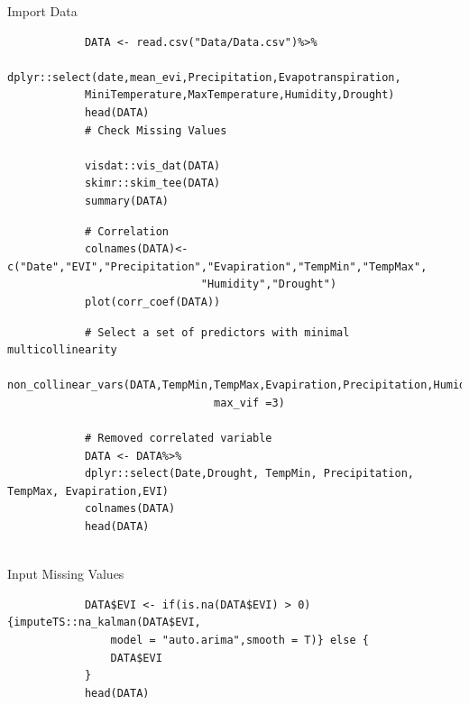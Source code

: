 \documentclass[12pt,a4paper]{book}
\begin{document}
			Import Data
			\begin{shaded}
				\begin{verbatim}
			DATA <- read.csv("Data/Data.csv")%>%
			dplyr::select(date,mean_evi,Precipitation,Evapotranspiration,
			MiniTemperature,MaxTemperature,Humidity,Drought)
			head(DATA)
			# Check Missing Values
			
			visdat::vis_dat(DATA)
			skimr::skim_tee(DATA)
			summary(DATA)
				\end{verbatim}
		\end{shaded}
	
				\begin{shaded}
				\begin{verbatim}
			# Correlation			
			colnames(DATA)<- c("Date","EVI","Precipitation","Evapiration","TempMin","TempMax",
			                  "Humidity","Drought")
			plot(corr_coef(DATA))
				\end{verbatim}
		\end{shaded}
	
				\begin{shaded}
				\begin{verbatim}
			# Select a set of predictors with minimal multicollinearity			
			non_collinear_vars(DATA,TempMin,TempMax,Evapiration,Precipitation,Humidity,Drought,
			                    max_vif =3)
			
			# Removed correlated variable			
			DATA <- DATA%>%
			dplyr::select(Date,Drought, TempMin, Precipitation, TempMax, Evapiration,EVI)			
			colnames(DATA)
			head(DATA)
			
				\end{verbatim}
	     	\end{shaded}
	Input Missing Values 
				\begin{shaded}
				\begin{verbatim}
			DATA$EVI <- if(is.na(DATA$EVI) > 0){imputeTS::na_kalman(DATA$EVI, 
				model = "auto.arima",smooth = T)} else {
				DATA$EVI
			}
			head(DATA)
		 	
				\end{verbatim}
		       \end{shaded}
	
\end{document}
